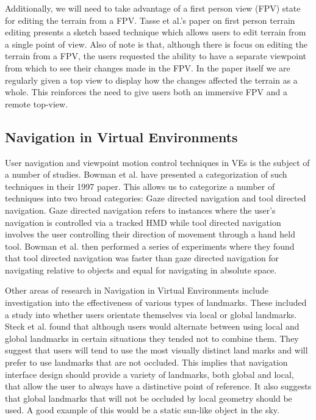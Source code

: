 \documentclass{sig-alternate-05-2015}
\begin{document}
Additionally, we will need to take advantage of a first person view (FPV) state for editing the terrain from a FPV. Tasse et al.'s paper on first person terrain editing presents a sketch based technique which allows users to  edit terrain from a single point of view\cite{Tasse2014}. Also of note is that, although there is focus on editing the terrain from a FPV, the users requested the ability to have a separate viewpoint from which to see their changes made in the FPV. In the paper itself we are regularly given a top view to display how the changes affected the terrain as a whole. This reinforces the need to give users both an immersive FPV and a remote top-view.
\subsection{Navigation in Virtual Environments}
User navigation and viewpoint motion control techniques in VEs is the subject of a number of studies. Bowman et al. have presented a categorization of such techniques in their 1997 paper\cite{Bowman1997}. This allows us to categorize a number of techniques into two broad categories: Gaze directed navigation and tool directed navigation. Gaze directed navigation refers to instances where the user's navigation is controlled via a tracked HMD while tool directed navigation involves the user controlling their direction of movement through a hand held tool. Bowman et al. then performed a series of experiments where they found that tool directed navigation was faster than gaze directed navigation for navigating relative to objects and equal for navigating in absolute space.

Other areas of research in Navigation in Virtual Environments include investigation into the effectiveness of various types of landmarks. These included a study into whether users orientate themselves via local or global landmarks\cite{Steck2000}. Steck et al. found that although users would alternate between using local and global landmarks in certain situations they tended not to combine them. They suggest that users will tend to use the most visually distinct land marks and will prefer to use landmarks that are not occluded. This implies that navigation interface design should provide a variety of landmarks, both global and local, that allow the user to always have a distinctive point of reference. It also suggests that global landmarks that will not be occluded by local geometry should be used. A good example of this would be a static sun-like object in the sky.
\end{document}
